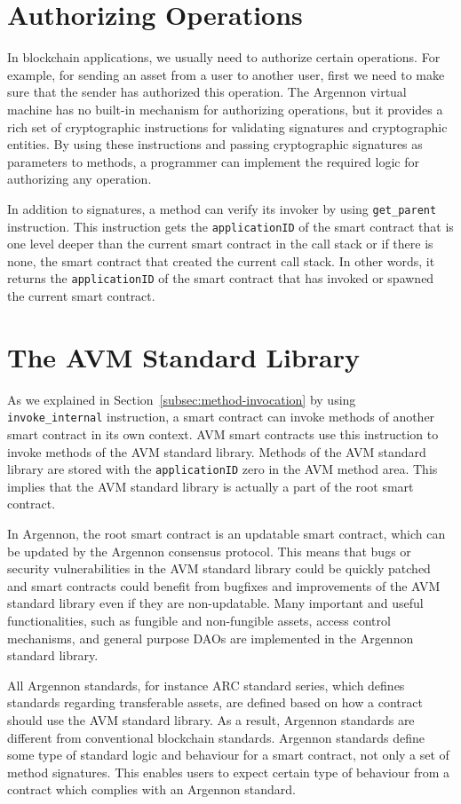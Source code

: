 \section{Authorizing Operations}\label{sec:authorizing-operations}

In blockchain applications, we usually need to authorize certain operations. For example, for sending an asset
from a user to another user, first we need to make sure that the sender has authorized this operation. The
Argennon virtual machine has no built-in mechanism for authorizing operations, but it provides a rich set of
cryptographic instructions for validating signatures and cryptographic entities. By using these instructions and
passing cryptographic signatures as parameters to methods, a programmer can implement the required logic
for authorizing any operation.


In addition to signatures, a method can verify its invoker by using \texttt{get\_parent} instruction. This
instruction gets the \texttt{applicationID} of the smart contract that is one level deeper than the current
smart contract in the call stack or if there is none, the smart contract that created the current call stack.
In other words, it returns the \texttt{applicationID} of the smart contract that has invoked or spawned
the current smart contract.


\section{The AVM Standard Library}\label{sec:the-avm-standard-library}

As we explained in Section~\ref{subsec:method-invocation} by using \texttt{invoke\_internal} instruction, a smart
contract can invoke methods of another smart contract in its own context. AVM smart contracts use this instruction to
invoke methods of the AVM standard library. Methods of the AVM standard library are stored
with the \texttt{applicationID} zero in the AVM method area. This implies that the AVM standard library is actually
a part of the root smart contract.

In Argennon, the root smart contract is an updatable smart contract, which can be updated by the Argennon consensus
protocol. This means that bugs or security vulnerabilities in the AVM standard library could be quickly patched and
smart contracts could benefit from bugfixes and improvements of the AVM standard library even if they are
non-updatable. Many important and useful functionalities,
such as fungible and non-fungible assets, access control mechanisms,
and general purpose DAOs are implemented in the Argennon standard library.

All Argennon standards, for instance ARC standard series, which defines standards regarding transferable assets,
are defined based on how a contract should use the AVM standard library. As a result, Argennon standards are
different from conventional blockchain standards. Argennon standards define some type of standard logic and
behaviour for a smart contract, not only a set of method signatures. This enables users to expect certain type
of behaviour from a contract which complies with an Argennon standard.
